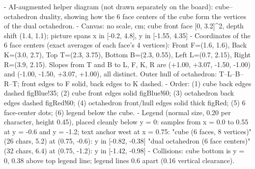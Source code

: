 \begin{content}
\begin{hidden}
- AI-augmented helper diagram (not drawn separately on the board): cube--octahedron duality, showing how the 6 face
  centers of the cube form the vertices of the dual octahedron.
- Canvas: no scale, cm; cube front face [0, 3.2]^2, depth shift (1.4, 1.1); picture spans x in [-0.2, 4.8], y in [-1.55, 4.35]
- Coordinates of the 6 face centers (exact averages of each face's 4 vertices):
  Front F=(1.6, 1.6), Back K=(3.0, 2.7), Top T=(2.3, 3.75), Bottom B=(2.3, 0.55), Left L=(0.7, 2.15), Right R=(3.9, 2.15).
  Slopes from T and B to {L, F, K, R} are (+1.00, +3.07, -1.50, -1.00) and (-1.00, -1.50, +3.07, +1.00), all distinct.
  Outer hull of octahedron: T--L--B--R--T; front edges to F solid, back edges to K dashed.
- Order: (1) cube back edges dashed figBlue!35; (2) cube front edges solid figBlue!60; (3) octahedron back edges dashed
  figRed!60; (4) octahedron front/hull edges solid thick figRed; (5) 6 face-center dots; (6) legend below the cube.
- Legend (normal size, 0.20 per character, height 0.45), placed cleanly below y = 0:
  samples from x = 0.0 to 0.55 at y = -0.6 and y = -1.2; text anchor west at x = 0.75:
  "cube (6 faces, 8 vertices)" (26 chars, 5.2) at (0.75, -0.6): y in [-0.82, -0.38]
  "dual octahedron (6 face centers)" (32 chars, 6.4) at (0.75, -1.2): y in [-1.42, -0.98]
- Collisions: cube bottom is y = 0, 0.38 above top legend line; legend lines 0.6 apart (0.16 vertical clearance).
\end{hidden}
\begin{center}
\end{center}
\end{content}
